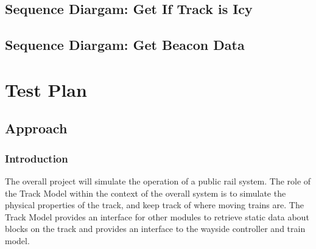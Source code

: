 \documentclass{scrreprt}
\begin{document}
\subsection{Sequence Diargam: Get If Track is Icy}
\begin{center}
\end{center}

\subsection{Sequence Diargam: Get Beacon Data}
\begin{center}
\end{center}

\section{Test Plan}

\subsection{Approach}

\subsubsection{Introduction}
The overall project will simulate the operation of a public rail system. The role of the Track Model within the context of the overall system is to simulate the physical properties of the track, and keep track of where moving trains are. The Track Model provides an interface for other modules to retrieve static data about blocks on the track and provides an interface to the wayside controller and train model.
\end{document}

